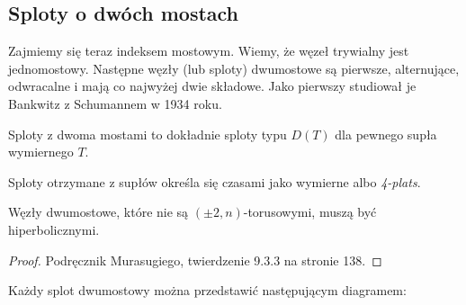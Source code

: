 \subsection{Sploty o dwóch mostach} %
\label{sub:twobridge}


Zajmiemy się teraz indeksem mostowym.
Wiemy, że węzeł trywialny jest jednomostowy.
Następne węzły (lub sploty) dwumostowe są pierwsze, alternujące, odwracalne i mają co najwyżej dwie składowe.
Jako pierwszy studiował je Bankwitz z Schumannem w 1934 roku.

\begin{proposition}
\label{prp:two_bridge_tangle}
	Sploty z dwoma mostami to dokładnie sploty typu $D(T)$ dla pewnego supła wymiernego $T$.
\end{proposition}

Sploty otrzymane z supłów określa się czasami jako wymierne albo \emph{4-plats}.

\begin{proposition}
\label{prp:two_bridge_hyperbolic}
	Węzły dwumostowe, które nie są $(\pm 2, n)$-torusowymi, muszą być hiperbolicznymi.
\end{proposition}

\begin{proof}
	Podręcznik \cite{murasugi96} Murasugiego, twierdzenie 9.3.3 na stronie 138.
\end{proof}


Każdy splot dwumostowy można przedstawić następującym diagramem:



